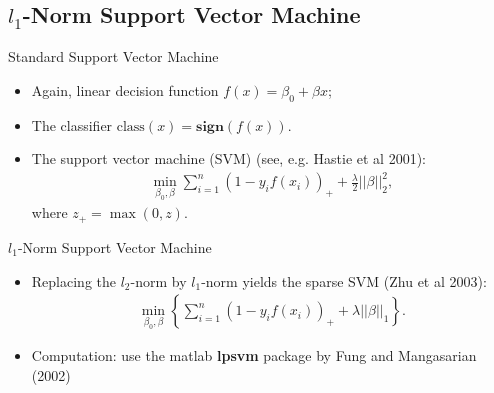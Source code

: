 \documentclass[12pt, trans]{beamer}
\newcommand{\1}[1]{{\mathbf 1}\left\{#1\right\}}        %
\begin{document}
\subsection{$l_1$-Norm Support Vector Machine}
\begin{frame}[fragile]{Standard Support Vector Machine}

\begin{itemize}[<+->]
\item Again, linear decision function $f(x) = \beta_0 + \beta x$;
\item The classifier $\text{class}(x) = \textbf{sign} (f(x))$. 
\item  The support vector machine (SVM) (see, e.g. Hastie et al 2001): 
\begin{align*}
\min_{\beta_0,\beta} \sum_{i=1}^n(1-y_if(x_i))_+ + \frac{\lambda}{2} ||\beta||_2^2,
\end{align*}
where $z_+ = \max(0,z)$. 
\end{itemize}

\end{frame}


\begin{frame}[fragile]{$l_1$-Norm Support Vector Machine}

\begin{itemize}[<+->]  
\item Replacing the $l_2$-norm by $l_1$-norm yields the sparse SVM (Zhu et al 2003):
\begin{align*}
\min_{\beta_0,\beta} \left\{ \sum_{i=1}^n(1-y_if(x_i))_+ + \lambda ||\beta||_1\right\}. 
\end{align*}
\item Computation: use the matlab \textbf{lpsvm} package by Fung and Mangasarian (2002)
\end{itemize}

\end{frame}
\end{document}
